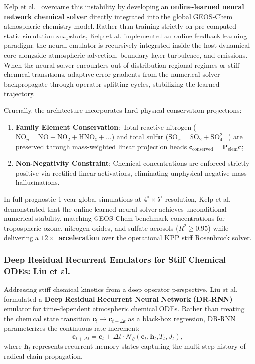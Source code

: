 Kelp et al.~\cite{kelp2022online} overcame this instability by developing an \textbf{online-learned neural network chemical solver} directly integrated into the global GEOS-Chem atmospheric chemistry model. Rather than training strictly on pre-computed static simulation snapshots, Kelp et al. implemented an online feedback learning paradigm: the neural emulator is recursively integrated inside the host dynamical core alongside atmospheric advection, boundary-layer turbulence, and emissions. When the neural solver encounters out-of-distribution regional regimes or stiff chemical transitions, adaptive error gradients from the numerical solver backpropagate through operator-splitting cycles, stabilizing the learned trajectory.

Crucially, the architecture incorporates hard physical conservation projections:
\begin{enumerate}
    \item \textbf{Family Element Conservation}: Total reactive nitrogen ($\text{NO}_y = \text{NO} + \text{NO}_2 + \text{HNO}_3 + \dots$) and total sulfur ($\text{SO}_x = \text{SO}_2 + \text{SO}_4^{2-}$) are preserved through mass-weighted linear projection heads $\mathbf{c}_{\text{conserved}} = \mathbf{P}_{\text{elem}} \mathbf{c}$;
    \item \textbf{Non-Negativity Constraint}: Chemical concentrations are enforced strictly positive via rectified linear activations, eliminating unphysical negative mass hallucinations.
\end{enumerate}
In full prognostic 1-year global simulations at $4^\circ \times 5^\circ$ resolution, Kelp et al. demonstrated that the online-learned neural solver achieves unconditional numerical stability, matching GEOS-Chem benchmark concentrations for tropospheric ozone, nitrogen oxides, and sulfate aerosols ($R^2 \ge 0.95$) while delivering a \textbf{$12\times$ acceleration} over the operational KPP stiff Rosenbrock solver.

\subsubsection{Deep Residual Recurrent Emulators for Stiff Chemical ODEs: Liu et al.}
Addressing stiff chemical kinetics from a deep operator perspective, Liu et al.~\cite{liu2025atmospheric} formulated a \textbf{Deep Residual Recurrent Neural Network (DR-RNN)} emulator for time-dependent atmospheric chemical ODEs. Rather than treating the chemical state transition $\mathbf{c}_t \to \mathbf{c}_{t+\Delta t}$ as a black-box regression, DR-RNN parameterizes the continuous rate increment:
\begin{equation}
    \mathbf{c}_{t+\Delta t} = \mathbf{c}_t + \Delta t \cdot \mathcal{N}_\theta(\mathbf{c}_t, \mathbf{h}_t, T_t, J_t),
    \label{eq:dr_rnn_formulation}
\end{equation}
where $\mathbf{h}_t$ represents recurrent memory states capturing the multi-step history of radical chain propagation.

